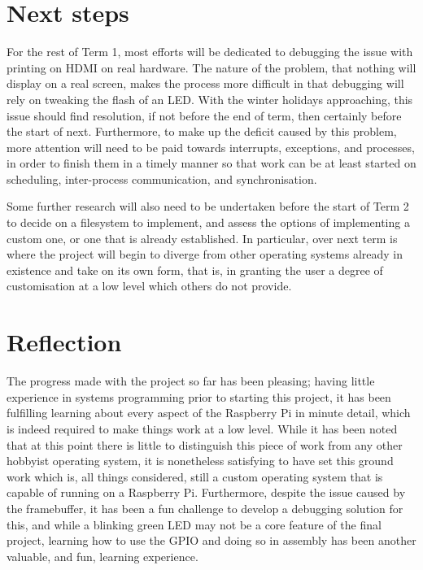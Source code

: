 \documentclass[10pt,a4paper]{article}
\begin{document}
\section{Next steps}
For the rest of Term 1, most efforts will be dedicated to debugging the issue
with printing on HDMI on real hardware. The nature of the problem, that nothing
will display on a real screen, makes the process more difficult in that
debugging will rely on tweaking the flash of an LED. With the winter holidays
approaching, this issue should find resolution, if not before the end of term,
then certainly before the start of next. Furthermore, to make up the deficit
caused by this problem, more attention will need to be paid towards interrupts,
exceptions, and processes, in order to finish them in a timely manner so that
work can be at least started on scheduling, inter-process communication, and
synchronisation.

Some further research will also need to be undertaken before the start of Term 2
to decide on a filesystem to implement, and assess the options of implementing a
custom one, or one that is already established. In particular, over next term is
where the project will begin to diverge from other operating systems already in
existence and take on its own form, that is, in granting the user a degree of
customisation at a low level which others do not provide.

\section{Reflection}
The progress made with the project so far has been pleasing; having little
experience in systems programming prior to starting this project, it has been
fulfilling learning about every aspect of the Raspberry Pi in minute detail,
which is indeed required to make things work at a low level. While it has been
noted that at this point there is little to distinguish this piece of work from
any other hobbyist operating system, it is nonetheless satisfying to have set
this ground work which is, all things considered, still a custom operating
system that is capable of running on a Raspberry Pi. Furthermore, despite the
issue caused by the framebuffer, it has been a fun challenge to develop a
debugging solution for this, and while a blinking green LED may not be a core
feature of the final project, learning how to use the GPIO and doing so in
assembly has been another valuable, and fun, learning experience.
\end{document}
